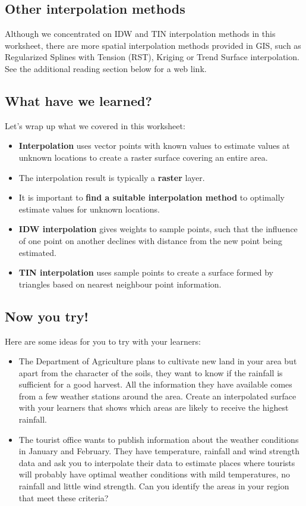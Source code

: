 \subsection{Other interpolation methods}

Although we concentrated on IDW and TIN interpolation methods in this
worksheet, there are more spatial interpolation methods provided in GIS, such
as Regularized Splines with Tension (RST), Kriging or Trend Surface
interpolation. See the additional reading section below for a web link. 

\subsection{What have we learned?}

Let's wrap up what we covered in this worksheet:

\begin{itemize}
\item \textbf{Interpolation} uses vector points with known values to estimate
values at unknown locations to create a raster surface covering an entire area.
\item The interpolation result is typically a \textbf{raster} layer.
\item It is important to \textbf{find a suitable interpolation method} to
optimally estimate values for unknown locations.
\item \textbf{IDW interpolation} gives weights to sample points, such that
the influence of one point on another declines with distance from the new
point being estimated.
\item \textbf{TIN interpolation} uses sample points to create a surface
formed by triangles based on nearest neighbour point information.
\end{itemize}

\subsection{Now you try!}

Here are some ideas for you to try with your learners:

\begin{itemize}
\item The Department of Agriculture plans to cultivate new land in your area but
apart from the character of the soils, they want to know if the rainfall is
sufficient for a good harvest. All the information they have available comes
from a few weather stations around the area. Create an interpolated surface
with your learners that shows which areas are likely to receive the highest
rainfall.
\item The tourist office wants to publish information about the weather conditions
in January and February. They have temperature, rainfall and wind strength
data and ask you to interpolate their data to estimate places where tourists
will probably have optimal weather conditions with mild temperatures, no
rainfall and little wind strength. Can you identify the areas in your region
that meet these criteria?
\end{itemize}

